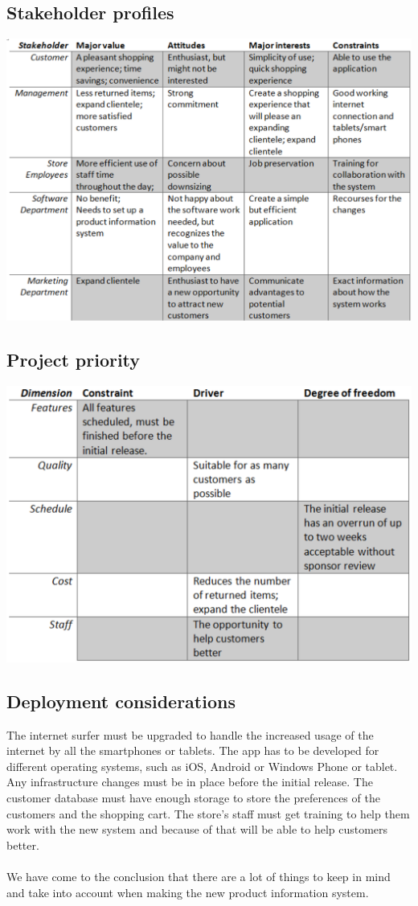 \documentclass[a4paper]{article}
\begin{document}
\subsection*{Stakeholder profiles}
\includegraphics[scale=0.7]{stakeholder_profiles.eps}

\subsection*{Project priority}
\includegraphics[scale=0.8]{project_priority.eps}

\subsection*{Deployment considerations}
The internet surfer must be upgraded to handle the increased usage of the internet by all the smartphones or tablets. The app has to be developed for different operating systems, such as iOS, Android or Windows Phone or tablet. Any infrastructure changes must be in place before the initial release. The customer database must have enough storage to store the preferences of the customers and the shopping cart. The store’s staff must get training to help them work with the new system and because of that will be able to help customers better.\\
\\
We have come to the conclusion that there are a lot of things to keep in mind and take into account when making the new product information system. 
\end{document}
